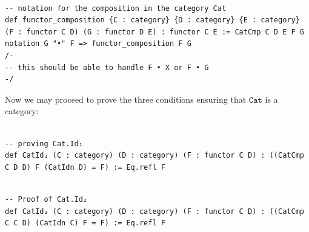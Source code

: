 \documentclass{book}
\newcounter{lcounter}
\begin{document}
\begin{center}
\begin{tcolorbox}[width=5in,colback={white},title={\begin{center}\texttt{Lean \thelcounter} \addtocounter{lcounter}{1}  \end{center}},colbacktitle=Blue,coltitle=black]
\begin{verbatim}

-- notation for the composition in the category Cat
def functor_composition {C : category} {D : category} {E : category} (F : functor C D) (G : functor D E) : functor C E := CatCmp C D E F G
notation G "•" F => functor_composition F G
/-
-- this should be able to handle F • X or F • G
-/

\end{verbatim}%
\end{tcolorbox}
\end{center}

Now we may proceed to prove the three conditions ensuring that $\texttt{Cat}$ is a category:

\begin{center}
\begin{tcolorbox}[width=5in,colback={white},title={\begin{center}\texttt{Lean \thelcounter} \addtocounter{lcounter}{1}  \end{center}},colbacktitle=Blue,coltitle=black]
\begin{verbatim}

-- proving Cat.Id₁
def CatId₁ (C : category) (D : category) (F : functor C D) : ((CatCmp C D D) F (CatIdn D) = F) := Eq.refl F

\end{verbatim}%
\end{tcolorbox}
\end{center}


\begin{center}
\begin{tcolorbox}[width=5in,colback={white},title={\begin{center}\texttt{Lean \thelcounter} \addtocounter{lcounter}{1}  \end{center}},colbacktitle=Blue,coltitle=black]
\begin{verbatim}

-- Proof of Cat.Id₂
def CatId₂ (C : category) (D : category) (F : functor C D) : ((CatCmp C C D) (CatIdn C) F = F) := Eq.refl F

\end{verbatim}%
\end{tcolorbox}
\end{center}
\end{document}
